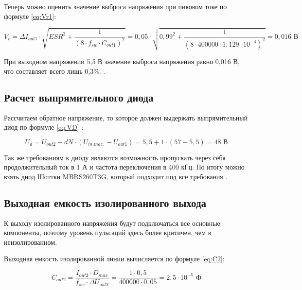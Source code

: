 Теперь можно оценить значение выброса напряжения при пиковом токе по формуле \ref{eq:Vr1}:

\begin{equation}
    V_{r} = \Delta I_{out1} \cdot \sqrt{ESR^{2} + \frac{1}{(8 \cdot f_{sw} \cdot C_{out1})^{2}}} =
    0,05 \cdot \sqrt{0,99^{2} + \frac{1}{(8 \cdot 400000 \cdot 1,129 \cdot 10^{-4})^{2}}} =
    0,016 \text{ В}
    \label{eq:Vr1}
\end{equation}

При выходном напряжении 5,5 В значение выброса напряжения равно 0,016 В, что составляет всего лишь 0,3\%. 
\cite{LMR36520:Aplication Note}.

\subsection{Расчет выпрямительного диода}
\hspace{1cm} 

Рассчитаем обратное напряжение, то которое должен выдержать выпрямительный диод по формуле \ref{eq:VD} 
\cite{LMR36520:Aplication Note}:

\begin{equation}
    U_{d} = U_{out2} + dN \cdot (U_{in. max.} - U_{out1}) =
     5,5 + 1 \cdot (57 - 5,5) = 48 \text{ В}
    \label{eq:VD}
\end{equation}

Так же требованиям к диоду являются возможность пропускать через себя продолжительный ток в 1 А и частота
переключения в 400 кГц. По итогу можно взять диод Шоттки MBRS260T3G, который подходит под все требования 
\cite{MBRS260T3G:datasheet}.

\subsection{Выходная емкость изолированного выхода}
\hspace{1cm}

К выходу изолированного напряжения будут подключаться все основные компоненты, поэтому уровень пульсаций 
здесь более критичен, чем в неизолированном. 

Выходная емкость изолированной линии вычисляется по формуле \ref{eq:C2}:

\begin{equation}
    C_{out2} = \frac{I_{out2} \cdot D_{max}}{f_{sw} \cdot \Delta U_{out2}} =
    \frac{1 \cdot 0,5}{400000 \cdot 0,05} =
    2,5 \cdot 10^{-5} \text{ Ф}
    \label{eq:C2}
\end{equation}

